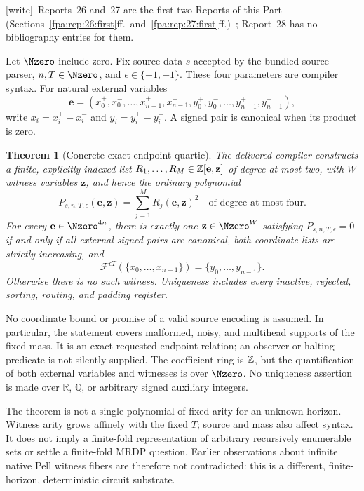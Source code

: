 \documentclass[11pt,a4paper]{article}
\numberwithin{equation}{section}
\newtheorem{theorem}{Theorem}[section]
\newcommand{\CA}{\mathcal F}\newcommand{\tabsize}{S_{\rm tab}}\newcommand{\Dv}{D_{\rm v}}
\newcommand{\wtag}{\textup{[write]}}
\begin{document}
\wtag\ Reports~26 and~27 are the first two Reports of this Part (Sections~\ref{fpa:rep:26:first}ff.\ and~\ref{fpa:rep:27:first}ff.)~\cite{fpa:r26,fpa:r27}; Report~28 has no bibliography entries for them.

Let $\Nzero$ include zero. Fix source data $s$ accepted by the bundled source parser, $n,T\in\Nzero$, and $\epsilon\in\{+1,-1\}$. These four parameters are compiler syntax. For natural external variables
\[
\mathbf e=(x_0^+,x_0^-,\ldots,x_{n-1}^+,x_{n-1}^-,
 y_0^+,y_0^-,\ldots,y_{n-1}^+,y_{n-1}^-),
\]
write $x_i=x_i^+-x_i^-$ and $y_i=y_i^+-y_i^-$. A signed pair is canonical when its product is zero.

\begin{theorem}[Concrete exact-endpoint quartic]\label{fpa:pq:thm:main}
The delivered compiler constructs a finite, explicitly indexed list
$R_1,\ldots,R_M\in\mathbb Z[\mathbf e,\mathbf z]$ of degree at most two, with $W$ witness variables $\mathbf z$, and hence the ordinary polynomial
\[
P_{s,n,T,\epsilon}(\mathbf e,\mathbf z)=\sum_{j=1}^{M}R_j(\mathbf e,\mathbf z)^2
\quad\text{of degree at most four}.
\]
For every $\mathbf e\in\Nzero^{4n}$, there is exactly one $\mathbf z\in\Nzero^W$ satisfying $P_{s,n,T,\epsilon}=0$ if and only if all external signed pairs are canonical, both coordinate lists are strictly increasing, and
\[
\CA^{\epsilon T}(\{x_0,\ldots,x_{n-1}\})
 =\{y_0,\ldots,y_{n-1}\}.
\]
Otherwise there is no such witness. Uniqueness includes every inactive, rejected, sorting, routing, and padding register.
\end{theorem}

No coordinate bound or promise of a valid source encoding is assumed. In particular, the statement covers malformed, noisy, and multihead supports of the fixed mass. It is an exact requested-endpoint relation; an observer or halting predicate is not silently supplied. The coefficient ring is $\mathbb Z$, but the quantification of both external variables and witnesses is over $\Nzero$. No uniqueness assertion is made over $\mathbb R$, $\mathbb Q$, or arbitrary signed auxiliary integers.

The theorem is not a single polynomial of fixed arity for an unknown horizon. Witness arity grows affinely with the fixed $T$; source and mass also affect syntax. It does not imply a finite-fold representation of arbitrary recursively enumerable sets or settle a finite-fold MRDP question. Earlier observations about infinite native Pell witness fibers are therefore not contradicted: this is a different, finite-horizon, deterministic circuit substrate.
\end{document}
